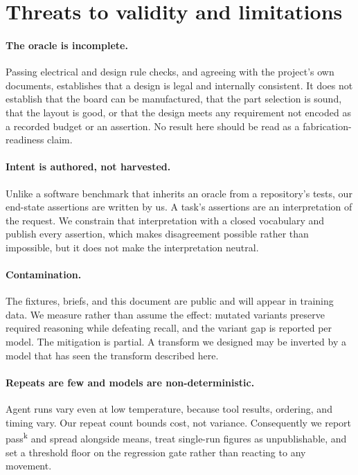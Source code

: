 \section{Threats to validity and limitations}
\label{sec:threats}

\paragraph{The oracle is incomplete.} Passing electrical and design rule checks, and agreeing with the project's own documents, establishes that a design is legal and internally consistent. It does not establish that the board can be manufactured, that the part selection is sound, that the layout is good, or that the design meets any requirement not encoded as a recorded budget or an assertion. No result here should be read as a fabrication-readiness claim.

\paragraph{Intent is authored, not harvested.} Unlike a software benchmark that inherits an oracle from a repository's tests, our end-state assertions are written by us. A task's assertions are an interpretation of the request. We constrain that interpretation with a closed vocabulary and publish every assertion, which makes disagreement possible rather than impossible, but it does not make the interpretation neutral.

\paragraph{Contamination.} The fixtures, briefs, and this document are public and will appear in training data. We measure rather than assume the effect: mutated variants preserve required reasoning while defeating recall, and the variant gap is reported per model. The mitigation is partial. A transform we designed may be inverted by a model that has seen the transform described here.

\paragraph{Repeats are few and models are non-deterministic.} Agent runs vary even at low temperature, because tool results, ordering, and timing vary. Our repeat count bounds cost, not variance. Consequently we report pass\textsuperscript{k} and spread alongside means, treat single-run figures as unpublishable, and set a threshold floor on the regression gate rather than reacting to any movement.

